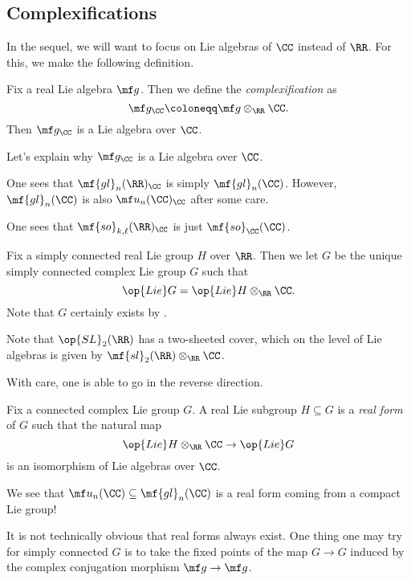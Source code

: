\documentclass[../notes.tex]{subfiles}
\begin{document}
\subsection{Complexifications}
In the sequel, we will want to focus on Lie algebras of $\CC$ instead of $\RR$. For this, we make the following definition.
\begin{definition}[complexification]
	Fix a real Lie algebra $\mf g$. Then we define the \textit{complexification} as
	\[\mf g_\CC\coloneqq\mf g\otimes_\RR\CC.\]
	Then $\mf g_\CC$ is a Lie algebra over $\CC$.
\end{definition}
\begin{remark}
	Let's explain why $\mf g_\CC$ is a Lie algebra over $\CC$.
\end{remark}
\begin{example}
	One sees that $\mf{gl}_n(\RR)_\CC$ is simply $\mf{gl}_n(\CC)$. However, $\mf{gl}_n(\CC)$ is also $\mf u_n(\CC)_\CC$ after some care.
\end{example}
\begin{example}
	One sees that $\mf{so}_{k,\ell}(\RR)_\CC$ is just $\mf{so}_\CC(\CC)$.
\end{example}
\begin{definition}[complexification]
	Fix a simply connected real Lie group $H$ over $\RR$. Then we let $G$ be the unique simply connected complex Lie group $G$ such that
	\[\op{Lie}G=\op{Lie}H\otimes_\RR\CC.\]
	Note that $G$ certainly exists by .
\end{definition}
\begin{example}
	Note that $\op{SL}_2(\RR)$ has a two-sheeted cover, which on the level of Lie algebras is given by $\mf{sl}_2(\RR)\otimes_\RR\CC$. 
\end{example}
With care, one is able to go in the reverse direction.
\begin{definition}
	Fix a connected complex Lie group $G$. A real Lie subgroup $H\subseteq G$ is a \textit{real form} of $G$ such that the natural map
	\[\op{Lie}H\otimes_\RR\CC\to\op{Lie}G\]
	is an isomorphism of Lie algebras over $\CC$.
\end{definition}
\begin{example}
	We see that $\mf u_n(\CC)\subseteq\mf{gl}_n(\CC)$ is a real form coming from a compact Lie group!
\end{example}
\begin{remark}
	It is not technically obvious that real forms always exist. One thing one may try for simply connected $G$ is to take the fixed points of the map $G\to G$ induced by the complex conjugation morphism $\mf g\to\mf g$.
\end{remark}
\end{document}
